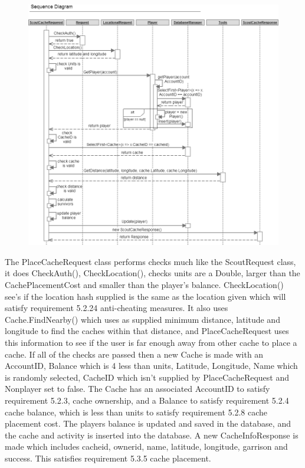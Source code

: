 \begin{figure}
    \centering
    \includegraphics[width=\textwidth]{images/sequence/scoutCache}
\end{figure}

The PlaceCacheRequest class performs checks much like the ScoutRequest class, it does CheckAuth(), CheckLocation(), checks units are a Double, larger than the CachePlacementCost and smaller than the player's balance. CheckLocation() see's if the location hash supplied is the same as the location given which will satisfy requirement 5.2.24 anti-cheating measures. It also uses Cache.FindNearby() which uses as supplied minimum distance, latitude and longitude to find the caches within that distance, and PlaceCacheRequest uses this information to see if the user is far enough away from other cache to place a cache. If all of the checks are passed then a new Cache is made with an AccountID, Balance which is 4 less than units, Latitude, Longitude, Name which is randomly selected, CacheID which isn't supplied by PlaceCacheRequest and Nonplayer set to false. The Cache has an associated AccountID to satisfy requirement 5.2.3, cache ownership, and a Balance to satisfy requirement 5.2.4 cache balance, which is less than units to satisfy requirement 5.2.8 cache placement cost. The players balance is updated and saved in the database, and the cache and activity is inserted into the database. A new CacheInfoResponse is made which includes cacheid, ownerid, name, latitude, longitude, garrison and success. This satisfies requirement 5.3.5 cache placement.

